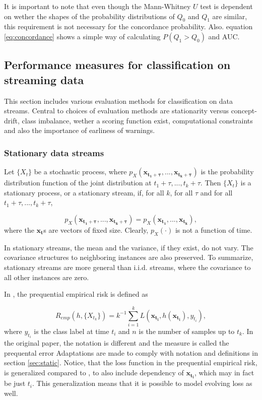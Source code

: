 It is important to note that even though the Mann-Whitney $U$ test is dependent on wether the shapes of the probability distributions of $Q_0$ and $Q_1$ are similar, this requirement is not necessary for the concordance probability.  Also. equation \eqref{eq:concordance} shows a simple way of calculating $P(Q_1 > Q_0)$ and AUC.

\subsection{Performance measures for classification on streaming data}
\label{sec:stream}

This section includes various evaluation methods for classification on data streams.  Central to choices of evaluation methods are stationarity versus concept-drift, class imbalance, wether a scoring function exist, computational constraints and also the importance of earliness of warnings.

\subsubsection{Stationary data streams}

Let $\{X_{t}\}$ be a stochastic process, where $p_X(\bm{x_{t_1 + \tau}},...,\bm{x_{t_k + \tau}} )$ is the probability distribution function of the joint distribution at $t_1 + \tau,...,t_k + \tau$.  Then $\{X_t\}$ is a stationary process, or a stationary stream, if, for all $k$, for all $\tau$ and for all $t_1 + \tau,...,t_k + \tau$, 

\begin{equation}
\label{eq:stationarity}
p_X(\bm{x_{t_1 + \tau}},...,\bm{x_{t_k + \tau}} ) = p_X(\bm{x_{t_1}},...,\bm{x_{t_k}} ),
\end{equation}
where the $\bm{x_t}$s are vectors of fixed size.  Clearly, $p_X(\cdot)$ is not a function of time.  

In stationary streams, the mean and the variance, if they exist, do not vary.  The covariance structures to neighboring instances are also preserved.  To summarize, stationary streams are more general than i.i.d. streams, where the covariance to all other instances are zero.  

In \cite{Gam13}, the prequential empirical risk is defined as 

\begin{equation}
\label{eq:prequentialRisk}
R_{emp}(h, \{X_{t_k}\}) = k^{-1} \sum_{i=1}^k L(\bm{x_{t_i}} , h(\bm{x_{t_i}} ), y_{t_i}),
\end{equation}
where $y_{t_i}$ is the class label at time $t_i$ and $n$ is the number of samples up to $t_k$.  In the original paper, the notation is different and the measure is called the prequental error  Adaptations are made to comply with notation and definitions in section \ref{sec:static}.  Notice, that the loss function in the prequential empirical risk, is generalized compared to \cite{Gam13}, to also include dependency of $\bm{x_{t_i}}$, which may in fact be just $t_i$.  This generalization means that it is possible to model evolving loss as well.

